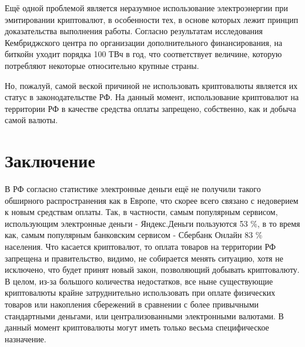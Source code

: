 \documentclass[12pt,a4paper]{article}
\begin{document}
Ещё одной проблемой является неразумное использование электроэнергии при эмитировании криптовалют, в особенности тех, в основе которых лежит принцип доказательства выполнения работы. Согласно результатам исследования Кембриджского центра по организации дополнительного финансирования, на биткойн уходит порядка 100 ТВч в год, что соответствует величине, которую потребляют некоторые относительно крупные страны. \cite{cite9}

Но, пожалуй, самой веской причиной не использовать криптовалюты является их статус в законодательстве РФ. На данный момент, использование криптовалют на территории РФ в качестве средства оплаты запрещено, собственно, как и добыча самой валюты.\cite{cite10}


\newpage

\section{Заключение}

В РФ согласно статистике электронные деньги ещё не получили такого обширного распространения как в Европе, что скорее всего связано с недоверием к  новым средствам оплаты.  Так, в частности, самым популярным сервисом, использующим электронные деньги - Яндекс.Деньги пользуются 53 \%,  в то время как, самым популярным банковским сервисом - Сбербанк Онлайн 83 \% населения.\cite[с.~16]{cite3} Что касается криптовалют, то оплата товаров на территории РФ запрещена и правительство, видимо, не собирается менять ситуацию, хотя не исключено, что будет принят новый закон, позволяющий добывать криптовалюту.\cite{cite10} В целом, из-за большого количества недостатков, все ныне существующие криптовалюты крайне затруднительно использовать при оплате физических товаров или накопления сбережений в сравнении с более привычными стандартными деньгами, или централизованными электронными валютами. В данный момент криптовалюты могут иметь только весьма специфическое назначение. 

\newpage
\end{document}
